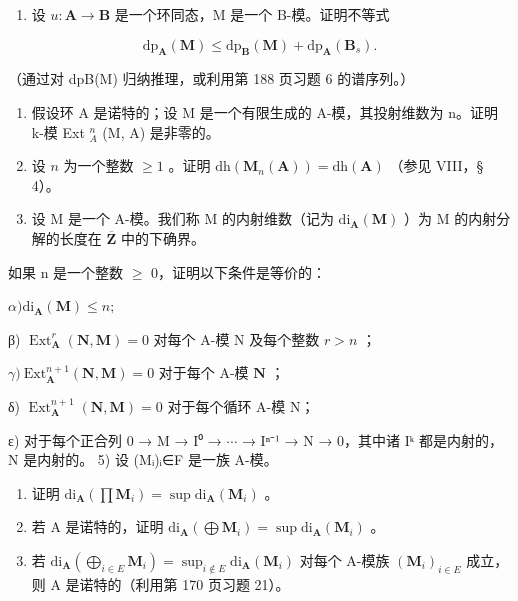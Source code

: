 
\begin{enumerate}
\def\labelenumi{\arabic{enumi})}
\tightlist
\item
  设 \(u: \mathbf{A} \to \mathbf{B}\) 是一个环同态，M 是一个 B-模。证明不等式
\end{enumerate}

\[
\mathrm{dp} _ {\mathbf {A}} (\mathbf {M}) \leqslant \mathrm{dp} _ {\mathbf {B}} (\mathbf {M}) + \mathrm{dp} _ {\mathbf {A}} (\mathbf {B} _ {s}).
\]

（通过对 dpB(M) 归纳推理，或利用第 188 页习题 6 的谱序列。）

\begin{enumerate}
\def\labelenumi{\arabic{enumi})}
\setcounter{enumi}{1}
\item
  假设环 A 是诺特的；设 M 是一个有限生成的 A-模，其投射维数为 n。证明 k-模 Ext \(_{A}^{n}\) (M, A) 是非零的。
\item
  设 \(n\) 为一个整数 \(\geqslant 1\) 。证明 \(\mathrm{dh}(\mathbf{M}_n(\mathbf{A})) = \mathrm{dh}(\mathbf{A})\) （参见 VIII，§ 4）。
\item
  设 M 是一个 A-模。我们称 M 的内射维数（记为 \(\mathrm{di}_{\mathbf{A}}(\mathbf{M})\) ）为 M 的内射分解的长度在 \(\overline{\mathbf{Z}}\) 中的下确界。
\end{enumerate}

如果 n 是一个整数 \(\geqslant\) 0，证明以下条件是等价的：

\(\alpha)\mathrm{di}_{\mathbf{A}}(\mathbf{M})\leqslant n;\)

β) \(\operatorname{Ext}_{\mathbf{A}}^{r}(\mathbf{N},\mathbf{M}) = 0\) 对每个 A-模 N 及每个整数 \(r > n\) ；

\(\gamma)\ \mathrm{Ext}_{\mathbf{A}}^{n+1}(\mathbf{N},\mathbf{M}) = 0\) 对于每个 A-模 \(\mathbf{N}\) ；

δ) \(\operatorname{Ext}_{\mathbf{A}}^{n+1}(\mathbf{N},\mathbf{M})=0\) 对于每个循环 A-模 N；

ε) 对于每个正合列 0 → M → I⁰ → \(\cdots\) → Iⁿ⁻¹ → N → 0，其中诸 Iᵏ 都是内射的，N 是内射的。 5) 设 (Mᵢ)ᵢ∈F 是一族 A-模。

\begin{enumerate}
\def\labelenumi{\alph{enumi})}
\item
  证明 \(\mathrm{di}_{\mathbf{A}}(\prod \mathbf{M}_i) = \sup \mathrm{di}_{\mathbf{A}}(\mathbf{M}_i)\) 。
\item
  若 A 是诺特的，证明 \(\mathrm{di}_{\mathbf{A}}(\bigoplus \mathbf{M}_i) = \sup \mathrm{di}_{\mathbf{A}}(\mathbf{M}_i)\) 。
\item
  若 \(\mathrm{di}_{\mathbf{A}}(\bigoplus_{i\in E}\mathbf{M}_{i}) = \sup_{i\notin E}\mathrm{di}_{\mathbf{A}}(\mathbf{M}_{i})\) 对每个 A-模族 \((\mathbf{M}_i)_{i\in E}\) 成立，则 A 是诺特的（利用第 170 页习题 21）。
\end{enumerate}

